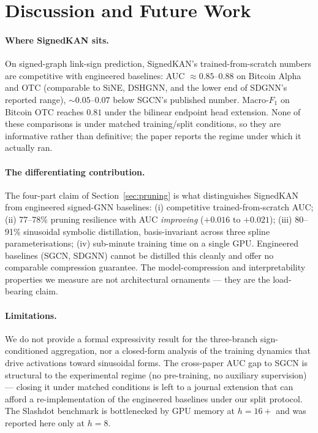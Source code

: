 \section{Discussion and Future Work}
\label{sec:discussion}

\paragraph{Where SignedKAN sits.}
On signed-graph link-sign prediction, SignedKAN's
trained-from-scratch numbers are competitive with engineered
baselines: AUC $\approx\!0.85$--$0.88$ on Bitcoin Alpha and OTC
(comparable to SiNE, DSHGNN, and the lower end of SDGNN's reported
range), $\sim\!0.05$--$0.07$ below SGCN's published number.
Macro-$F_1$ on Bitcoin OTC reaches $0.81$ under the bilinear
endpoint head extension. None of these comparisons is under matched
training/split conditions, so they are informative rather than
definitive; the paper reports the regime under which it actually ran.

\paragraph{The differentiating contribution.}
The four-part claim of Section~\ref{sec:pruning} is what
distinguishes SignedKAN from engineered signed-GNN baselines:
(i) competitive trained-from-scratch AUC; (ii) 77--78\% pruning
resilience with AUC \emph{improving} ($+0.016$ to $+0.021$);
(iii) 80--91\% sinusoidal symbolic distillation, basis-invariant
across three spline parameterisations; (iv) sub-minute training time
on a single GPU. Engineered baselines (SGCN, SDGNN) cannot be
distilled this cleanly and offer no comparable compression
guarantee. The model-compression and interpretability properties
we measure are not architectural ornaments — they are the
load-bearing claim.

\paragraph{Limitations.}
We do not provide a formal expressivity result for the three-branch
sign-conditioned aggregation, nor a closed-form analysis of the
training dynamics that drive activations toward sinusoidal forms.
The cross-paper AUC gap to SGCN is structural to the experimental
regime (no pre-training, no auxiliary supervision) — closing it
under matched conditions is left to a journal extension that can
afford a re-implementation of the engineered baselines under our
split protocol. The Slashdot benchmark is bottlenecked by GPU memory
at $h\!=\!16+$ and was reported here only at $h\!=\!8$.

